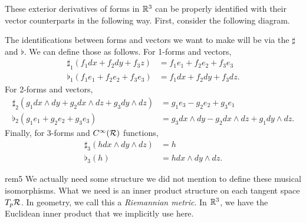 These exterior derivatives of forms in $\mathbb{R}^3$ can be properly identified with their vector counterparts in the following way.  First, consider the following diagram.
\begin{center}
\end{center}
\noindent The identifications between forms and vectors we want to make will be via the  $\sharp$ and $\flat$.  We can define those as follows. For 1-forms and vectors,
\begin{align*}
    \sharp_1 (f_1 dx + f_2 dy + f_3 z) &= f_1 e_1 + f_2 e_2 + f_3 e_3\\
    \flat_1 (f_1 e_1 + f_2 e_2 + f_3 e_3) &= f_1 dx + f_2 dy + f_3 dz.
\end{align*}
\noindent For 2-forms and vectors,
\begin{align*}
    \sharp_2 ( g_1 dx\wedge dy + g_2 dx\wedge dz + g_3 dy\wedge dz) &= g_1e_3-g_2e_2+g_3e_1\\
    \flat_2 (g_1 e_1 + g_2e_2 + g_3 e_3) &= g_3 dx \wedge dy - g_2 dx\wedge dz + g_1 dy \wedge dz.
\end{align*}
Finally, for 3-forms and $C^\infty(\mathcal{R})$ functions,
\begin{align*}
    \sharp_3 (h dx\wedge dy \wedge dz) &= h\\
    \flat_3 (h) &= hdx\wedge dy\wedge dz.
\end{align*}

\begin{remark}{}{rem5}
We actually need some structure we did not mention to define these musical isomorphisms. What we need is an inner product structure on each tangent space $T_p\mathcal{R}$.  In geometry, we call this a \emph{Riemannian metric}.  In $\mathbb{R}^3$, we have the Euclidean inner product that we implicitly use here.
\end{remark}

